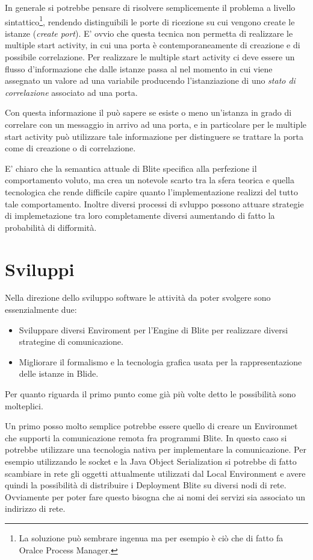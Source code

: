 In generale si potrebbe pensare di risolvere semplicemente il problema a livello
sintattico\footnote{La soluzione può sembrare ingenua ma per esempio è ciò che
di fatto fa Oralce Process Manager.}, rendendo distinguibili le porte di
ricezione su cui vengono create le istanze (\emph{create port}). E' ovvio che questa tecnica non permetta di realizzare le multiple start
activity, in cui una porta è contemporaneamente di creazione e di possibile
correlazione. Per realizzare le multiple start activity ci deve essere un
flusso d'informazione che dalle istanze passa al  nel
momento in cui viene assegnato un valore ad una variabile producendo
l'istanziazione di uno \emph{stato di correlazione} associato ad una porta.

Con questa informazione il  può sapere se esiste o meno
un'istanza in grado di correlare con un messaggio in arrivo ad una porta, e in
particolare per le multiple start activity può utilizzare tale informazione per
distinguere se trattare la porta come di creazione o di correlazione.

E' chiaro che la semantica attuale di Blite specifica alla perfezione il
comportamento voluto, ma crea un notevole scarto tra la sfera teorica e quella
tecnologica che rende difficile capire quanto l'implementazione realizzi del
tutto tale comportamento. Inoltre diversi processi di svluppo possono attuare
strategie di implemetazione tra loro completamente diversi aumentando di fatto
la probabilità di difformità.
  
\section{Sviluppi}

Nella direzione dello sviluppo software le attività da poter svolgere sono
essenzialmente due:

\begin{itemize}
  \item Sviluppare diversi Enviroment per l'Engine di Blite per realizzare
  diversi strategine di comunicazione.
  \item Migliorare il formalismo e la tecnologia grafica usata per la
  rappresentazione delle istanze in Blide.
\end{itemize} 

Per quanto riguarda il primo punto come già più volte detto le possibilità sono
molteplici. 

Un primo posso molto semplice potrebbe essere quello di creare un Environmet
che supporti la comunicazione remota fra programmi Blite. In questo caso si
potrebbe utilizzare una tecnologia nativa per implementare la comunicazione. Per
esempio utilizzando le socket e la Java Object Serialization si potrebbe di
fatto scambiare in rete gli oggetti attualmente utilizzati dal Local
Environment e avere quindi la possibilità di
distribuire i Deployment Blite su diversi nodi di rete. Ovviamente per poter
fare questo bisogna che ai nomi dei servizi sia associato un indirizzo di rete.

